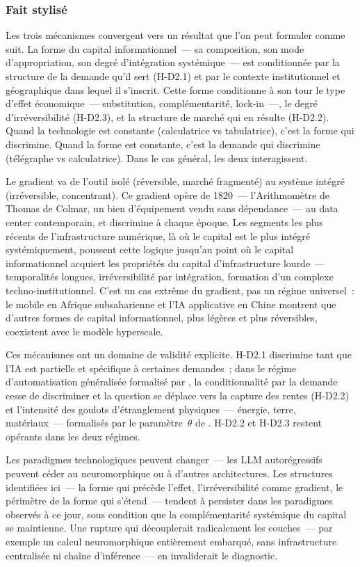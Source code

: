 \subsubsection{Fait stylisé}

Les trois mécanismes convergent vers un résultat que l'on peut formuler comme suit. La forme du capital informationnel~--- sa composition, son mode d'appropriation, son degré d'intégration systémique~--- est conditionnée par la structure de la demande qu'il sert (H-D2.1) et par le contexte institutionnel et géographique dans lequel il s'inscrit. Cette forme conditionne à son tour le type d'effet économique~--- substitution, complémentarité, lock-in~---, le degré d'irréversibilité (H-D2.3), et la structure de marché qui en résulte (H-D2.2). Quand la technologie est constante (calculatrice vs tabulatrice), c'est la forme qui discrimine. Quand la forme est constante, c'est la demande qui discrimine (télégraphe vs calculatrice). Dans le cas général, les deux interagissent.

Le gradient va de l'outil isolé (réversible, marché fragmenté) au système intégré (irréversible, concentrant). Ce gradient opère de 1820~--- l'Arithmomètre de Thomas de Colmar, un bien d'équipement vendu sans dépendance~--- au data center contemporain, et discrimine à chaque époque. Les segments les plus récents de l'infrastructure numérique, là où le capital est le plus intégré systémiquement, poussent cette logique jusqu'au point où le capital informationnel acquiert les propriétés du capital d'infrastructure lourde~--- temporalités longues, irréversibilité par intégration, formation d'un complexe techno-institutionnel. C'est un cas extrême du gradient, pas un régime universel~: le mobile en Afrique subsaharienne et l'IA applicative en Chine montrent que d'autres formes de capital informationnel, plus légères et plus réversibles, coexistent avec le modèle hyperscale.

Ces mécanismes ont un domaine de validité explicite. H-D2.1 discrimine tant que l'IA est partielle et spécifique à certaines demandes~; dans le régime d'automatisation généralisée formalisé par \textcite{restrepo_wont_be_missed_2025}, la conditionnalité par la demande cesse de discriminer et la question se déplace vers la capture des rentes (H-D2.2) et l'intensité des goulots d'étranglement physiques~--- énergie, terre, matériaux~--- formalisés par le paramètre~$\theta$ de \textcite{jones_ai_rd_2025}. H-D2.2 et H-D2.3 restent opérants dans les deux régimes.

Les paradigmes technologiques peuvent changer~--- les LLM autorégressifs peuvent céder au neuromorphique ou à d'autres architectures. Les structures identifiées ici~--- la forme qui précède l'effet, l'irréversibilité comme gradient, le périmètre de la forme qui s'étend~--- tendent à persister dans les paradigmes observés à ce jour, sous condition que la complémentarité systémique du capital se maintienne. Une rupture qui découplerait radicalement les couches~--- par exemple un calcul neuromorphique entièrement embarqué, sans infrastructure centralisée ni chaîne d'inférence~--- en invaliderait le diagnostic.

